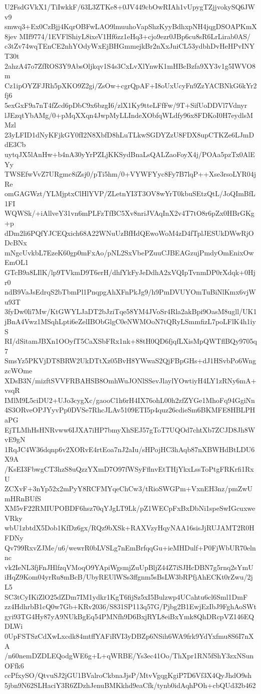 U2FsdGVkX1/TiIwkkF/63L3ZTKe8+0JV449cbOwRIAh1vUpygTZjjvokySQ6JWv9
smwq3+Ex0CzBjj4KqrOBFwLAO9lmuuhoVapShzKyyBdhxpNH4jqgDSOAPKmX8jev
MIf9774/1EVFlShiyL8ixeV1Hf6zz1eHq3+cjo9ezr0JBp6cu8sR6LrLirab0AS/
c3tZv74wqTEnCE2nhYOdyWxEjBHGmmejkBr2nXxJniCL53ydbhDvHeHPvINYT30t
2ahzA47o7ZfROS3Y9AbsOljkqv1S4s3CxLvXlYnwK1mHBcBzfa9XY3v1g5IWVO8m
Cz1ipOYZFJRh5pXKO9Z2gi/ZsOw+cgrQpAF+I8oUxUcyFn9ZzYACBNkG6kYr2fj6
5exGxF9a7nT4fZcd6pDbC9x6bzgI6/zlX1Ky9tteLFfFw/9T+SifUoDDVl7Vdnyr
lJEzqtYbAMg/0+pMqXXqn4JwpMyLLIndeXObfqWLdfy96x8FDKoI0H7eydlsMMzl
23yLFID1dNyKFjkGY0fI2N8XbfD8hLuTLkwSGDYZzU8FDX8upCTKZe6LJmDdE3Cb
uytqJX5lAnHw+b4nA30yYrPZLjKKSydBnaLsQALZaoFoyX4j/POAa5pzTx0AlEYy
TWSEfwVvZ7URgmc8iZsj0/pTi5hm/0+VYWFYyc8Fy7B7lqP++Xse3rsoLYR04jRe
omGAGWzt/YLMjptxClHlYVP/ZLetnYI3T3OV8wYrT0kbuSEtzQtL/JoQImBfL1FI
WQWSk/+iAllveY31vn6mPLFzTfBC5Xv8nriJVAqInX2v4T7tO8r6pZx0HBrGKg+p
dDm2li6PQfYJCEQxich68A22WNuUzBfHdQEwoWoM4zD4fTplJESUkDWwRjODcBNx
mNgcUvkbL7EzeK60gp0mFxAo/pNL2SxVbePZuuCJBEAGzujPmdyOmEnixOwEmOL1
GTcB9a8LIlK/lp9TVkmD9T6erH/dhfYkFyJeDdhA2xVQIpTvnmDP0rXdqk+0Hjr0
ndB9VaJsEdrqS2bTbmPl1PnqpgAhXFnPkJg9/h9PmDVUYOmTuBiNlKmx6vjWu93T
3fyDw0li7Mw/KtGWYLJaDT2bJziTqe58YM4JVoSr4Rla2akBpi9OasM8ugll/UK1
jBnA4Vwz1MSqhLpti6eZelIBObGlgC0eNWMOoN7tQRyLSmmfizL7poLFlK4h1iyS
RI/dSitamJBXn1OOyfT5CaXSbFRx1nk+88tH0QD6fjqfLXisMpQWTflBQy9705q7
SmsYz5PKVjDT8BRW2UkDTtXz05BvH8YWwaS2QjFBpGHs+dJ1HSvbPo6WngzcWOme
XDsB3N/mizftSVVFRBAHSB8OmhWuJONlSSevJlaylYOwtiyH4LY1zRNy6mA+vsqR
IMlM9L5ciDU2+UJo3cygXc/gaooC1h6rH4IX76ohL00h2zfZYGe1MhoFq94GgiNn
4S3ORveOPJYyvPp0DVSe7RhcJLAv5109ETI5p4quz26cdieSm6BKMFE8HBLPHaPG
EjTLMhHsHNRvww6IJXA7iHP7bmyXhSEJ57gToT7UQOd7chtXb7ZCJD8Jh8WvE9gN
1RqJC4W36dqnp6v2XORvE4rtEoa7nJ2aIu/sHPojHC3hAqb87nXBWHdBtLDU6X9A
/KsEI3FbwgCT3hzS8uQzzYXmD7O97fWSyFflnvEtTHjYkxLssToPtgFRKrfi1RxU
ZCXvF+3nYp52x2mPyY8RCFMYqeChCw3/tRioSWGPm+VxnEH3nz/pmZwUmHRnBUfS
XM5vF22RMIUPOBDF6hsz70qYJgLT9Lk/pZ1WECpFxBxDbNi1speSwIGcuxweVRky
wbU1zbtdX5Dob1KfDz6gx/RQz9bXSk+RAXVzyHqyNAA16sisJjRUJAMT2R0HFDNy
Qv799RxvZJMe/u6/wewrR0bLVSLg7nEmBrfqqGu+ieMHDulf+P0FjWbUR70elnnc
vk2IeNL3fjFnJHlfzqVMoqO9YApiWgsmjZuUpBljZ44Z7iSJHcDBN7g5rnq2sYmU
iHqZ9Kom04yrRu8mBcB/UbyREUlWSs3ffgnm5sBsLW3bRPfjAhECKt0rZwu/2jL5
SC3tCyIKiZlO25dZDm7IM1ydkr1KgT6fijSz5xI5Bulzwp4UCahtu6cl6Sml1DmF
zz4HdhrbB1cQ0w7Gb+KRv2036/S831SP113q57G/Pjbg2B1EwjEzIbJ9FghAoSWt
gyi93TG4Hy87yA9NUkBgEq54PMNfh9D6BxjRYL8eiBxYmk8QhDRcpVZ146EQDLWi
0UpFSTSzCdXwLxcdk84mtffYAFiRVI3yDBZp6NSih6WA9frk9YdYxfmu8S6I7nXA
/n60nemDZDLEQodgWE6g+L+qWRBE/Ys3ec41Oo/ThXpr1RN5fShY3zxNSunOFfk6
ccPfxySO/QtvuSJ2jGU1BValroCkbnaJjsP/MtvVgqgKgiP7D6Vf3X4QyJhdO9sh
5jbn9N62SLHaciY3R6ZDzhJenuBMKkhd9eaCfk/tynb0idAqhPOh+cbQUd32b462
